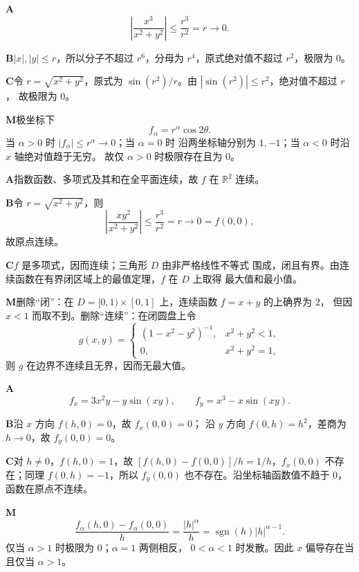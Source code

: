 \begin{solutionBox}
\textbf{A}\quad
\[
\left|\frac{x^3}{x^2+y^2}\right|
\le\frac{r^3}{r^2}=r\to0.
\]

\textbf{B}\quad \(|x|,|y|\le r\)，所以分子不超过 \(r^6\)，分母为
\(r^4\)，原式绝对值不超过 \(r^2\)，极限为 \(0\)。

\textbf{C}\quad 令 \(r=\sqrt{x^2+y^2}\)，原式为
\(\sin(r^2)/r\)。由 \(|\sin(r^2)|\le r^2\)，绝对值不超过 \(r\)，
故极限为 \(0\)。

\textbf{M}\quad 极坐标下
\[
f_\alpha=r^\alpha\cos2\theta.
\]
当 \(\alpha>0\) 时 \(|f_\alpha|\le r^\alpha\to0\)；当 \(\alpha=0\) 时
沿两坐标轴分别为 \(1,-1\)；当 \(\alpha<0\) 时沿 \(x\) 轴绝对值趋于无穷。
故仅 \(\alpha>0\) 时极限存在且为 \(0\)。
\end{solutionBox}

\begin{solutionBox}
\textbf{A}\quad 指数函数、多项式及其和在全平面连续，故 \(f\) 在
\(\mathbb R^2\) 连续。

\textbf{B}\quad 令 \(r=\sqrt{x^2+y^2}\)，则
\[
\left|\frac{xy^2}{x^2+y^2}\right|
\le\frac{r^3}{r^2}=r\to0=f(0,0),
\]
故原点连续。

\textbf{C}\quad \(f\) 是多项式，因而连续；三角形 \(D\) 由非严格线性不等式
围成，闭且有界。由连续函数在有界闭区域上的最值定理，\(f\) 在 \(D\) 上取得
最大值和最小值。

\textbf{M}\quad 删除“闭”：在
\(D=[0,1)\times[0,1]\) 上，连续函数 \(f=x+y\) 的上确界为 \(2\)，
但因 \(x<1\) 而取不到。删除“连续”：在闭圆盘上令
\[
g(x,y)=
\begin{cases}(1-x^2-y^2)^{-1},&x^2+y^2<1,\\0,&x^2+y^2=1,\end{cases}
\]
则 \(g\) 在边界不连续且无界，因而无最大值。
\end{solutionBox}

\begin{solutionBox}
\textbf{A}\quad
\[
f_x=3x^2y-y\sin(xy),\qquad
f_y=x^3-x\sin(xy).
\]

\textbf{B}\quad 沿 \(x\) 方向 \(f(h,0)=0\)，故 \(f_x(0,0)=0\)；
沿 \(y\) 方向 \(f(0,h)=h^2\)，差商为 \(h\to0\)，故 \(f_y(0,0)=0\)。

\textbf{C}\quad 对 \(h\ne0\)，\(f(h,0)=1\)，故
\([f(h,0)-f(0,0)]/h=1/h\)，\(f_x(0,0)\) 不存在；同理
\(f(0,h)=-1\)，所以 \(f_y(0,0)\) 也不存在。沿坐标轴函数值不趋于 \(0\)，
函数在原点不连续。

\textbf{M}\quad
\[
\frac{f_\alpha(h,0)-f_\alpha(0,0)}h
=\frac{|h|^\alpha}{h}
=\operatorname{sgn}(h)|h|^{\alpha-1}.
\]
仅当 \(\alpha>1\) 时极限为 \(0\)；\(\alpha=1\) 两侧相反，
\(0<\alpha<1\) 时发散。因此 \(x\) 偏导存在当且仅当 \(\alpha>1\)。
\end{solutionBox}

